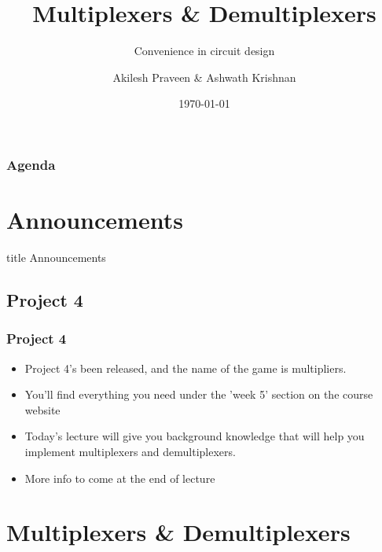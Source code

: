 \documentclass{beamer}
\title{Multiplexers \& Demultiplexers}
\subtitle{Convenience in circuit design}
\author[A Praveen \& A Krishnan]{Akilesh Praveen \& Ashwath Krishnan}
\institute{UMD}
\date{\today}
\begin{document}
    \begin{frame}
        \titlepage
    \end{frame}
    
    \begin{frame}
        \frametitle{Agenda}
        \tableofcontents
    \end{frame}
    
    \section{Announcements}
    
        \begin{frame}
                \vfill
                \centering
                \begin{beamercolorbox}[sep=8pt,center,shadow=true,rounded=true]{title}
                    Announcements\par%
                \end{beamercolorbox}
                \vfill
             \end{frame}
    
        \subsection{Project 4}
        
            
            
            \begin{frame}
                \frametitle{Project 4}
                \begin{itemize}
                    \item Project 4's been released, and the name of the game is multipliers.
                    \item You'll find everything you need under the 'week 5' section on the course website
                    \item Today's lecture will give you background knowledge that will help you implement multiplexers and demultiplexers.
                    
                    \item More info to come at the end of lecture
                    
                \end{itemize}
            \end{frame}
            
    \section{Multiplexers \& Demultiplexers}
    
\end{document}

